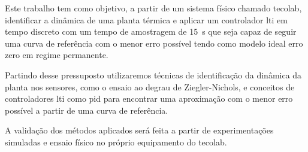 Este trabalho tem como objetivo, a partir de um sistema físico chamado
\gls{tecolab}, identificar a dinâmica de uma planta térmica e aplicar um
controlador \gls{lti} em tempo discreto com um tempo de amostragem de
\SI{15}{\second} que seja capaz de seguir uma curva de referência com o menor
erro possível tendo como modelo ideal erro zero em regime permanente.

Partindo desse pressuposto utilizaremos técnicas de identificação da dinâmica da
planta nos sensores, como o ensaio ao degrau de Ziegler-Nichols, e conceitos de
controladores \gls{lti} como \gls{pid} para encontrar uma aproximação com o
menor erro possível a partir de uma curva de referência.

A validação dos métodos aplicados será feita a partir de experimentações
simuladas e ensaio físico no próprio equipamento do \gls{tecolab}.
